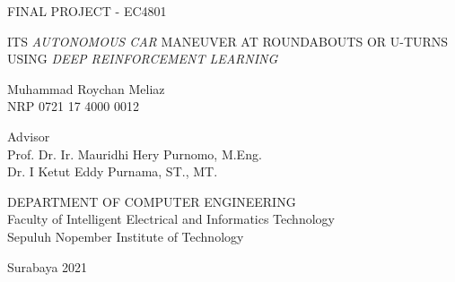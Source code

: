 FINAL PROJECT - EC4801

\vspace{6ex}

\begin{large}
  ITS \textit{AUTONOMOUS CAR }MANEUVER AT ROUNDABOUTS OR U-TURNS USING \textit{DEEP REINFORCEMENT LEARNING}
\end{large}

\vspace{4ex}

Muhammad Roychan Meliaz\\
NRP 0721 17 4000 0012

\vspace{2ex}

Advisor \\
Prof. Dr. Ir. Mauridhi Hery Purnomo, M.Eng. \\
Dr. I Ketut Eddy Purnama, ST., MT.

\vspace{6ex}

DEPARTMENT OF COMPUTER ENGINEERING\\
Faculty of Intelligent Electrical and Informatics Technology\\
Sepuluh Nopember Institute of Technology

Surabaya 2021
